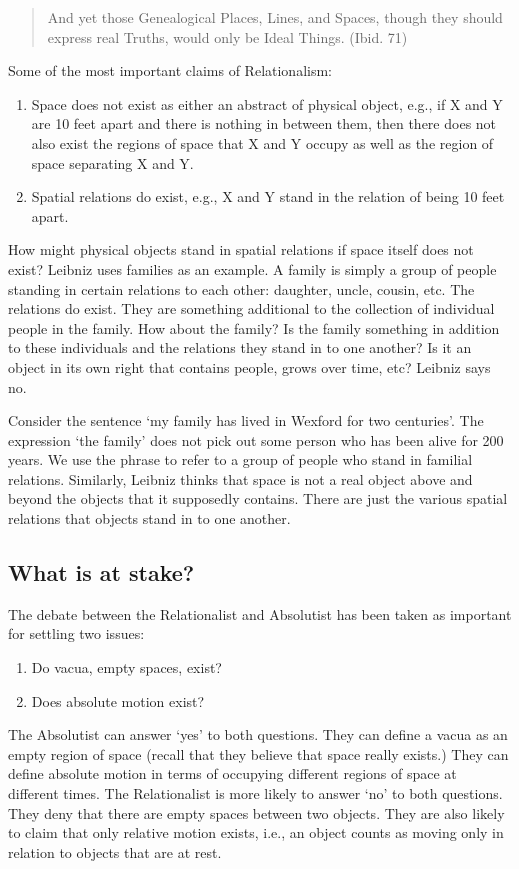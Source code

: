 \documentclass[oneside]{article}
\begin{document}
\begin{quote}
And yet those Genealogical Places, Lines, and Spaces, though they should
express real Truths, would only be Ideal Things. (Ibid. 71)
\end{quote}
Some of the most important claims of Relationalism:
\begin{enumerate}
\item Space does not exist as either an abstract of physical object, e.g., if X and Y are 10 feet apart and there is nothing in between
them, then there does not also exist the regions of
space that X and Y occupy as well as the region of space separating X and Y.
\item Spatial relations do exist, e.g., X and Y stand in the relation of being 10 feet apart.
\end{enumerate}
How might physical objects stand in spatial relations if space itself does not exist? Leibniz uses families as an example. A family is simply a group of people standing in certain relations to
each other: daughter, uncle, cousin, etc. The relations do exist. They are something
additional to the collection of individual people in the family. How about the family? Is the family
something in addition to these individuals and the relations they stand in to one another? Is it an
object in its own right that contains people, grows over time, etc? Leibniz says no.

Consider the sentence `my family has lived in Wexford for two
centuries'. The expression `the family' does not pick out some person
who has been alive for 200 years. We use the phrase to refer to a group
of people who stand in familial relations. Similarly, Leibniz thinks
that space is not a real object above and beyond the objects that it
supposedly contains. There are just the various spatial relations that
objects stand in to one another.



\subsection*{What is at stake?}\label{what-is-at-stake}

The debate between the Relationalist and Absolutist has been taken as
important for settling two issues:

\begin{enumerate}
\item
  Do vacua, empty spaces, exist?
\item
  Does absolute motion exist? 
\end{enumerate}
The Absolutist can answer `yes' to both questions. They can define a
vacua as an empty region of space (recall that they believe that space
really exists.) They can define absolute motion in terms of occupying
different regions of space at different times. The Relationalist is more
likely to answer `no' to both questions. They deny that there are empty spaces between two objects. They are also likely to claim that only relative motion exists, i.e., an object counts as moving only in relation to objects that are at rest.
\end{document}
